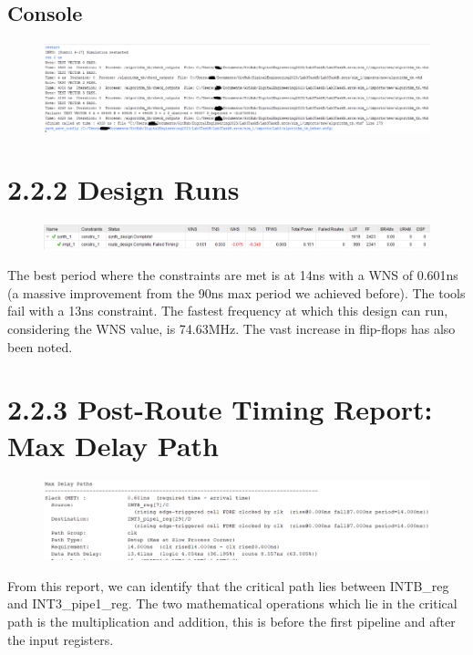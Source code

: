 \documentclass[11pt]{report}
\begin{document}
\subsection*{Console}
\begin{figure}[H]
    \includegraphics[width=\columnwidth]{Assets/2.2.1_console.png}
\end{figure}

\section*{2.2.2 Design Runs}
\begin{figure}[H]
    \includegraphics[width=\columnwidth]{Assets/2.2.2_design-runs.png}
\end{figure}
The best period where the constraints are met is at 14ns with a WNS of 0.601ns (a massive improvement from the 90ns max period we achieved before). The tools fail with a 13ns constraint. The fastest frequency at which this design can run, considering the WNS value, is 74.63MHz. The vast increase in flip-flops has also been noted.

\section*{2.2.3 Post-Route Timing Report: Max Delay Path}
\begin{figure}[H]
    \includegraphics[width=\columnwidth]{Assets/2.2.3_max-delay-path.png}
\end{figure}
From this report, we can identify that the critical path lies between INTB\_reg and INT3\_pipe1\_reg. The two mathematical operations which lie in the critical path is the multiplication and addition, this is before the first pipeline and after the input registers.
\end{document}
